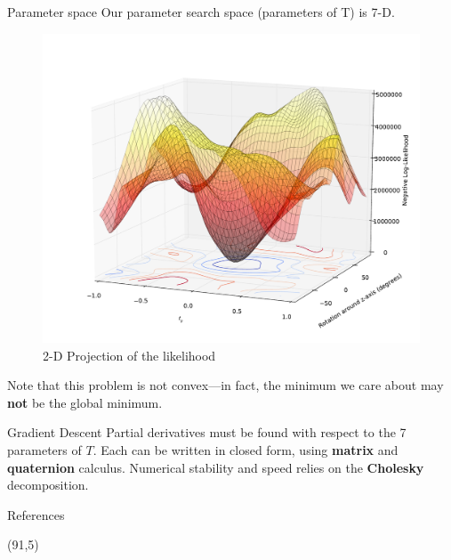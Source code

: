 \documentclass[final]{beamer}
\begin{document}
\begin{frame}{}
\begin{textblock}{27}
\begin{block}{Parameter space}
Our parameter search space (parameters of T) is 7-D.
\begin{figure}
\includegraphics[width=10in]{LLmap3.pdf}
\caption{2-D Projection of the likelihood}
\end{figure}
Note that this problem is not convex---in fact, the minimum we care about may {\bf not} be the global minimum. 
\end{block}

\begin{block}{Gradient Descent}
Partial derivatives must be found with respect to the 7 parameters of $T$. Each can be written in closed form,
using {\bf matrix} and {\bf quaternion} calculus. Numerical stability and speed relies on the {\bf Cholesky} decomposition.
\end{block}


\begin{block}{References}
{


}
\end{block}


\end{textblock}
\begin{textblock}{27}(91,5)


\end{textblock}
\end{frame}
\end{document}
